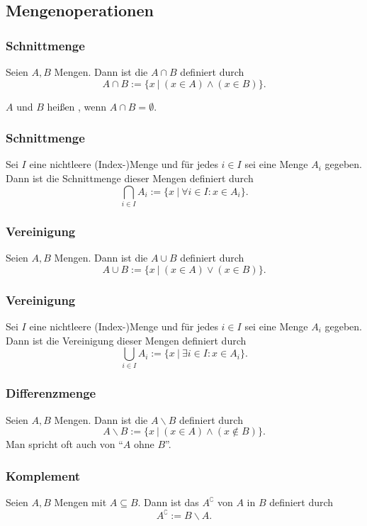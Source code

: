\subsection{Mengenoperationen}
%
\begin{frame}\frametitle{Schnittmenge}
	
	Seien $A,B$ Mengen. Dann ist die  $A\cap B$ definiert durch
	$$
		A\cap B := \big\{ x ~|~ (x\in A) \land (x\in B) \big\}.
	$$
	
	\pause
	\vspace{5mm}
	$A$ und $B$ hei{\ss}en , wenn $A\cap B = \emptyset$.
	
\end{frame}
%
%
\begin{frame}\frametitle{Schnittmenge}
	
	Sei $I$ eine nichtleere (Index-)Menge und für jedes $i\in I$ sei eine Menge $A_i$ gegeben. \\
	Dann ist die Schnittmenge dieser Mengen definiert durch	
	$$
		\bigcap_{i\in I} A_i := \big\{ x ~|~  \forall i \in I: x \in A_i \big\}.
	$$
	
\end{frame}
%
%
\begin{frame}\frametitle{Vereinigung}

	Seien $A,B$ Mengen. Dann ist die  $A\cup B$ definiert durch
	$$
		A\cup B := \big\{ x ~|~ (x\in A) \lor (x\in B) \big\}.
	$$
	
\end{frame}
%
%
\begin{frame}\frametitle{Vereinigung}
	
	Sei $I$ eine nichtleere (Index-)Menge und für jedes $i\in I$ sei eine Menge $A_i$ gegeben. \\
	Dann ist die Vereinigung dieser Mengen definiert durch	
	$$
		\bigcup_{i\in I} A_i := \big\{ x ~|~  \exists i \in I: x \in A_i \big\}.
	$$
	
\end{frame}
%
%
\begin{frame}\frametitle{Differenzmenge}

	Seien $A,B$ Mengen. Dann ist die  $A\backslash B$ definiert durch
	$$
		A\backslash B := \big\{ x ~|~ (x\in A) \land (x\notin B) \big\}.
	$$
	\vfill
	Man spricht oft auch von ``$A$ ohne $B$''.
\end{frame}
%
%
\begin{frame}\frametitle{Komplement}
	
	Seien $A,B$ Mengen mit $A\subseteq B$. Dann ist das  $A^{\complement}$ von $A$ in $B$ definiert durch
	$$
		A^\complement := B \backslash A.
	$$
	
\end{frame}
%



